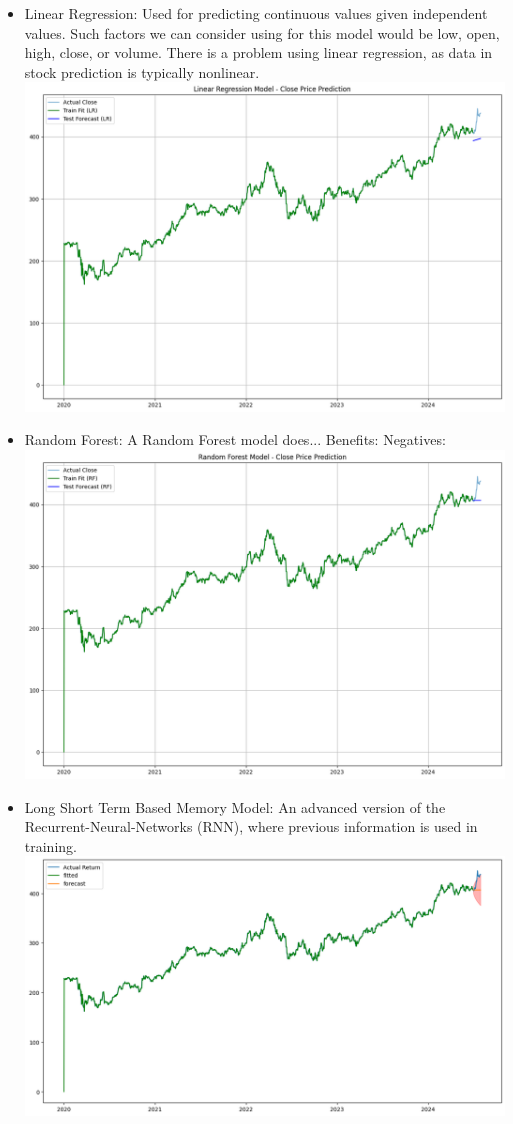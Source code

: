 \documentclass[conference]{IEEEtran}
\begin{document}
\begin{itemize}
\item{Linear Regression: }
Used for predicting continuous values given independent values.  Such factors we can consider using for this model would be low, open, high, close, or volume.  There is a problem using linear regression, as data in stock prediction is typically nonlinear.
\includegraphics[scale=0.5]{screenshots/linreg.png}

\item{Random Forest: }
A Random Forest model does...  Benefits:  Negatives:
\includegraphics[scale=0.5]{screenshots/ranfor.png}

\item{Long Short Term Based Memory Model: }
An advanced version of the Recurrent-Neural-Networks (RNN), where previous information is used in training.  
\includegraphics[scale=0.5]{screenshots/arima.png}


\end{itemize}
\end{document}
